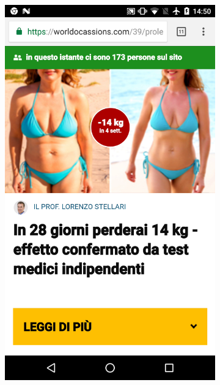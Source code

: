 \begin{figure}[h]
\begin{center}
\begin{subfigure}{.18\textwidth}
    \begin{center}
        \includegraphics[scale=0.06]{figs/mobile_2}
        \caption{}
    \end{center}
    \end{subfigure}
    \begin{subfigure}{.18\textwidth}
    \begin{center}

\end{center}
\end{subfigure}
\end{center}
\end{figure}
